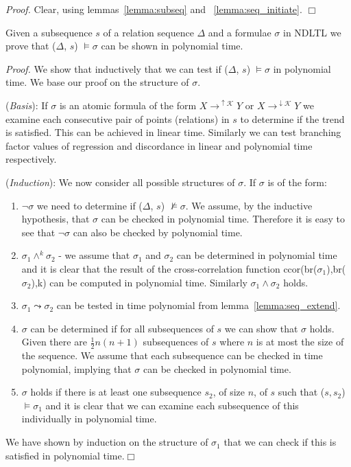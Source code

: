 {\em Proof.} Clear, using lemmas~\ref{lemma:subseq} and ~\ref{lemma:seq_initiate}. $\Box$


 
\begin{theorem}
\begin{rm}
Given a subsequence $s$ of a relation sequence $\Delta$ and a formulae $\sigma$ in NDLTL
we prove that ($\Delta$, $s$) $\models \sigma$ can be shown in
 polynomial time.
\end{rm}
\end{theorem}

\smallskip

{\em Proof.} We show that inductively that we can test if  
($\Delta$, $s$) $\models \sigma$ in
polynomial time. We base our proof on the structure of $\sigma$.

\smallskip
({\em Basis}): If $\sigma$ is an atomic formula of the form $X
\to^{\uparrow\mathcal{K}} Y$ or  $X \to^{\downarrow\mathcal{K}} Y$ we
examine each consecutive pair of points (relations) in $s$ to determine if the trend
is satisfied. This can be achieved in linear time. Similarly we can
test branching factor values of regression and discordance in linear
and polynomial time respectively.

\smallskip
({\em Induction}): We now consider all possible structures of
$\sigma$. If $\sigma$ is of the form:
\begin{enumerate}
\item $\neg \sigma$  we need to determine if ($\Delta$, $s$)
$\not\models \sigma$. We assume, by the inductive hypothesis, that
$\sigma$ can be checked in polynomial time. Therefore it is easy to
see that $\neg \sigma$ can also be checked by polynomial time.
\item $\sigma_1 \wedge^k \sigma_2$ - we assume that $\sigma_1$ and
$\sigma_2$ can be determined in polynomial time and it is clear that
the result of the cross-correlation function
ccor(br($\sigma_1$),br($\sigma_2$),k) can be computed in polynomial
time. Similarly $\sigma_1 \wedge \sigma_2$ holds.
\item $\sigma_1 \leadsto \sigma_2$ can be tested in time polynomial
from lemma~\ref{lemma:seq_extend}.  
\item {} $\sigma$ can be determined if for all subsequences of $s$
we can show that $\sigma$ holds.  Given  there
are $\frac{1}{2} n(n+1)$ subsequences of $s$ where $n$ is at most the
size of the sequence. We assume that each
subsequence can be checked in time polynomial, implying that 
$\sigma$ can be checked in polynomial time.
\item {} $\sigma$ holds if there is at least one subsequence
$s_2$, of size $n$,
of $s$ such that ($s, s_2$) $\models \sigma_1$ and it is clear
that we can examine each subsequence of this individually in
polynomial time.
\end{enumerate}
We have shown by induction on the structure of $\sigma_1$ that we can
check if this is satisfied in polynomial time.$\Box$
 

